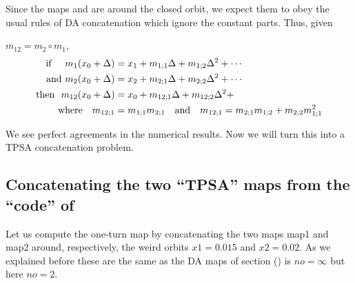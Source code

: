 \documentclass{hitec}     %
\begin{document}
{Since the maps  and  are around the closed orbit, we expect them to obey the usual rules of DA concatenation which ignore the constant parts. Thus, given {$m_{12}=m_2 \circ m_1$, 
%
\begin{subequations}\begin{align} {\rm i}{\rm f}~~~~{m}_{1}({x}_{0}+\Delta )&={x}_{1}+{m}_{1;1}\Delta +{m}_{1;2}{\Delta }^{2}+\cdots\label{eq:map1}\\ {\rm a}{\rm n}{\rm d} ~{m}_{2}({x}_{0}+\Delta )&={x}_{2}+{m}_{2;1}\Delta +{m}_{2;2}{\Delta }^{2}+\cdots \\ {\rm t}{\rm h}{\rm e}{\rm n}~~{m}_{12}({x}_{0}+\Delta )&={x}_{0}+{m}_{12;1}\Delta +{m}_{12;2}{\Delta }^{2}+\ \  \\~~~{\rm w}{\rm h}{\rm e}{\rm r}{\rm e}~~~{m}_{12;1}&=
{m}_{1;1}{m}_{2;1}~~~{\rm a}{\rm n}{\rm d} ~~~{m}_{12;1}=
{m}_{2;1}{m}_{1;2}+{m}_{2;2}{m}_{1;1}^{2} \end{align}\end{subequations}

We see perfect agreements in the numerical results. Now we will turn this into a TPSA concatenation problem.


\renewcommand{\codefont}{\small}

\subsection{Concatenating the two ``TPSA'' maps from the ``code'' of }\label{s:exampletpsa}
 
 Let us compute  the one-turn map by concatenating the two maps   map1 and map2 around, respectively,  the weird orbits $x1= 0.015$ and $x2=0.02$.  As we explained before these are the same as the DA maps of section () is $no=\infty$ but here $no=2$.

}}
\end{document}
